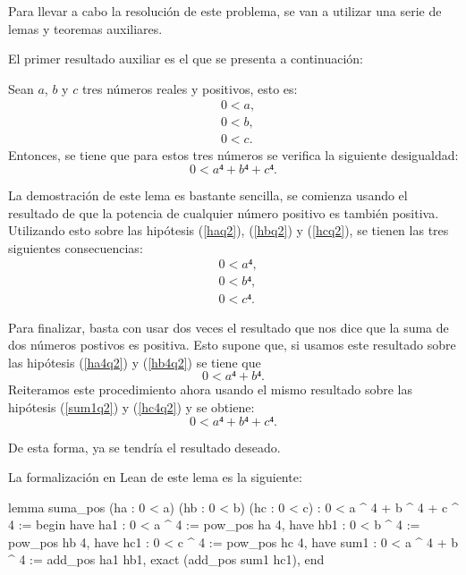 Para llevar a cabo la resolución de este problema, se van a utilizar
una serie de lemas y teoremas auxiliares.

El primer resultado auxiliar es el que se presenta a continuación:

\begin{lema}\label{lemasuma}
  Sean \(a\), \(b\) y \(c\) tres números reales y positivos, esto es:
  \begin{align}
    &0 < a, \label{haq2}\tag{ha}\\
    &0 < b, \label{hbq2}\tag{hb}\\
    &0 < c. \label{hcq2}\tag{hc}
  \end{align}
  Entonces, se tiene que para estos tres números se verifica la
  siguiente desigualdad:
  \begin{equation}
    0 < a⁴+b⁴+c⁴.
  \end{equation}
\end{lema}

\begin{demostracion}
  La demostración de este lema es bastante sencilla, se comienza usando
  el resultado de que la potencia de cualquier número positivo es
  también positiva. Utilizando esto sobre las hipótesis (\ref{haq2}),
  (\ref{hbq2}) y (\ref{hcq2}), se tienen las tres siguientes
  consecuencias:
  \begin{align}
    &0 < a⁴, \label{ha4q2}\tag{ha1}\\
    &0 < b⁴, \label{hb4q2}\tag{hb1}\\
    &0 < c⁴. \label{hc4q2}\tag{hc1}
  \end{align}

  Para finalizar, basta con usar dos veces el resultado que nos dice que
  la suma de dos números postivos es positiva. Esto supone que, si
  usamos este resultado sobre las hipótesis (\ref{ha4q2}) y
  (\ref{hb4q2}) se tiene que
  \begin{equation}\label{sum1q2}\tag{sum1}
    0 < a⁴+b⁴.
  \end{equation}
  Reiteramos este procedimiento ahora usando el mismo resultado sobre
  las hipótesis (\ref{sum1q2}) y (\ref{hc4q2}) y se obtiene:
  \begin{equation}
    0 < a⁴+b⁴+c⁴.
  \end{equation}

  De esta forma, ya se tendría el resultado deseado.
\end{demostracion}

La formalización en Lean de este lema es la siguiente:
\begin{leancode}
lemma suma_pos
  (ha : 0 < a)
  (hb : 0 < b)
  (hc : 0 < c)
  : 0 < a ^ 4 + b ^ 4 + c ^ 4 :=
begin
  have ha1 : 0 < a ^ 4          := pow_pos ha 4,
  have hb1 : 0 < b ^ 4          := pow_pos hb 4,
  have hc1 : 0 < c ^ 4          := pow_pos hc 4,
  have sum1 : 0 < a ^ 4 + b ^ 4 := add_pos ha1 hb1,
  exact (add_pos sum1 hc1),
end
\end{leancode}

